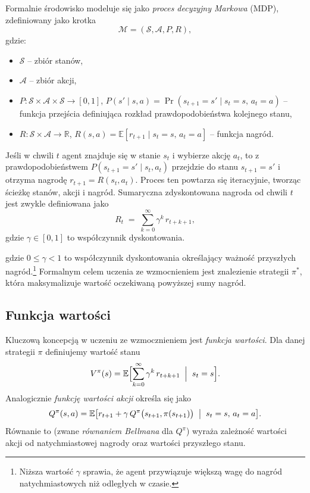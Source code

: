 \documentclass[a4paper,12pt]{article}
\begin{document}
Formalnie środowisko modeluje się jako \emph{proces decyzyjny Markowa} (MDP), zdefiniowany jako krotka
\[
\mathcal{M} = (\mathcal{S}, \mathcal{A}, P, R),
\]
gdzie:
\begin{itemize}
  \item $\mathcal{S}$ – zbiór stanów,
  \item $\mathcal{A}$ – zbiór akcji,
  \item $P: \mathcal{S}\times\mathcal{A}\times\mathcal{S}\to[0,1]$, \quad
        $P(s' \mid s,a)=\Pr(s_{t+1}=s'\mid s_t=s,\,a_t=a)$ – funkcja przejścia definiująca rozkład prawdopodobieństwa kolejnego stanu,
  \item $R: \mathcal{S}\times\mathcal{A}\to\mathbb{R}$, \quad
        $R(s,a)=\mathbb{E}[r_{t+1}\mid s_t=s,\,a_t=a]$ – funkcja nagród.
\end{itemize}

Jeśli w chwili $t$ agent znajduje się w stanie $s_t$ i wybierze akcję $a_t$, to z prawdopodobieństwem 
$P(s_{t+1}=s'\mid s_t,a_t)$ przejdzie do stanu $s_{t+1}=s'$ i otrzyma nagrodę 
$r_{t+1}=R(s_t,a_t)$. Proces ten powtarza się iteracyjnie, tworząc ścieżkę stanów, akcji i nagród. 
Sumaryczna zdyskontowana nagroda od chwili $t$ jest zwykle definiowana jako
\[
R_t \;=\; \sum_{k=0}^{\infty} \gamma^k\,r_{t+k+1},
\]
gdzie $\gamma\in[0,1]$ to współczynnik dyskontowania.

gdzie \(0 \le \gamma < 1\) to współczynnik dyskontowania określający ważność przyszłych nagród.\footnote{Niższa wartość \(\gamma\) sprawia, że agent przywiązuje większą wagę do nagród natychmiastowych niż odległych w czasie.} Formalnym celem uczenia ze wzmocnieniem jest znalezienie strategii \(\pi^*\), która maksymalizuje wartość oczekiwaną powyższej sumy nagród.

\subsection*{Funkcja wartości}
Kluczową koncepcją w uczeniu ze wzmocznieniem jest \emph{funkcja wartości}. Dla danej strategii \(\pi\) definiujemy wartość stanu
\[
V^{\pi}(s)
= \mathbb{E}\Bigl[\sum_{k=0}^\infty \gamma^k\,r_{t+k+1}\;\Bigm|\;s_t=s\Bigr].
\]
Analogicznie \emph{funkcję wartości akcji} określa się jako
\[
Q^{\pi}(s,a)
= \mathbb{E}\bigl[r_{t+1} + \gamma\,Q^{\pi}\bigl(s_{t+1},\pi(s_{t+1})\bigr)\;\bigm|\;s_t=s,\,a_t=a\bigr].
\]
Równanie to (zwane \emph{równaniem Bellmana} dla \(Q^\pi\)) wyraża zależność wartości akcji od natychmiastowej nagrody oraz wartości przyszłego stanu. 
\end{document}

